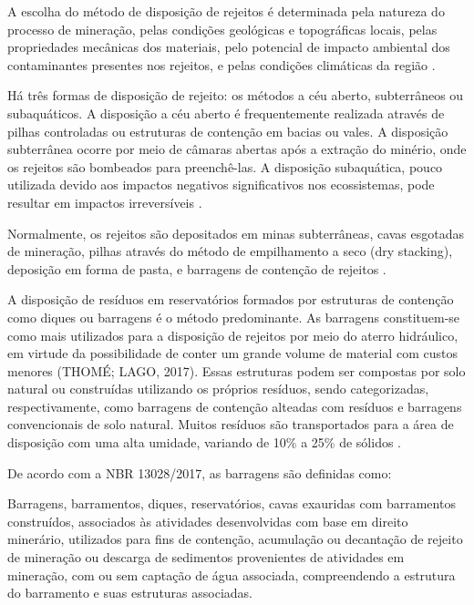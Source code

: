 A escolha do método de disposição de rejeitos é determinada pela
natureza do processo de mineração, pelas condições geológicas e
topográficas locais, pelas propriedades mecânicas dos materiais, pelo
potencial de impacto ambiental dos contaminantes presentes nos rejeitos,
e pelas condições climáticas da região \cite{ibram2016gestao}.

Há três formas de disposição de rejeito: os métodos a céu aberto,
subterrâneos ou subaquáticos. A disposição a céu aberto é frequentemente
realizada através de pilhas controladas ou estruturas de contenção em
bacias ou vales. A disposição subterrânea ocorre por meio de câmaras
abertas após a extração do minério, onde os rejeitos são bombeados para
preenchê-las. A disposição subaquática, pouco utilizada devido aos
impactos negativos significativos nos ecossistemas, pode resultar em
impactos irreversíveis \cite{erazo2006selecao}.

Normalmente, os rejeitos são depositados em minas subterrâneas, cavas
esgotadas de mineração, pilhas através do método de empilhamento a seco
(dry stacking), deposição em forma de pasta, e barragens de contenção de
rejeitos \cite{ibram2016gestao}.

A disposição de resíduos em reservatórios formados por estruturas de
contenção como diques ou barragens é o método predominante. As barragens
constituem-se como mais utilizados para a disposição de rejeitos por
meio do aterro hidráulico, em virtude da possibilidade de conter um
grande volume de material com custos menores (THOMÉ; LAGO, 2017). Essas
estruturas podem ser compostas por solo natural ou construídas
utilizando os próprios resíduos, sendo categorizadas, respectivamente,
como barragens de contenção alteadas com resíduos e barragens
convencionais de solo natural. Muitos resíduos são transportados para a
área de disposição com uma alta umidade, variando de 10\% a 25\% de
sólidos \cite{ibram2016gestao}.

De acordo com a NBR 13028/2017, as barragens são definidas como:

\begin{citacao}
Barragens, barramentos, diques, reservatórios, cavas exauridas com
barramentos construídos, associados às atividades desenvolvidas com
base em direito minerário, utilizados para fins de contenção,
acumulação ou decantação de rejeito de mineração ou descarga de
sedimentos provenientes de atividades em mineração, com ou sem
captação de água associada, compreendendo a estrutura do barramento e
suas estruturas associadas. \cite[3.4]{abnt2017nbr13028}
\end{citacao}


